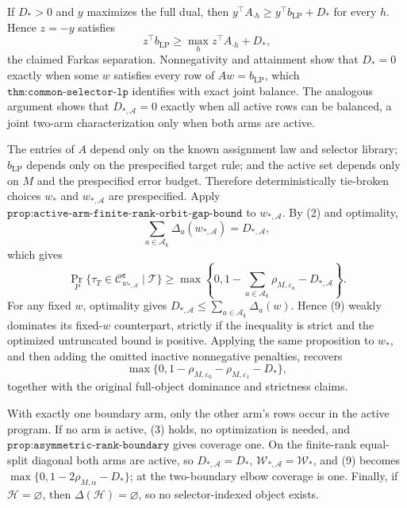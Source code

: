 If \(D_*>0\) and \(y\) maximizes the full dual, then \(y^\top A_{\cdot h}\ge y^\top b_{\mathrm{LP}}+D_*\) for every \(h\). Hence \(z=-y\) satisfies
\[
z^\top b_{\mathrm{LP}}\ge\max_h z^\top A_{\cdot h}+D_*,
\]
the claimed Farkas separation. Nonnegativity and attainment show that \(D_*=0\) exactly when some \(w\) satisfies every row of \(Aw=b_{\mathrm{LP}}\), which \(\texttt{thm:common-selector-lp}\) identifies with exact joint balance. The analogous argument shows that \(D_{*,\mathcal A}=0\) exactly when all active rows can be balanced, a joint two-arm characterization only when both arms are active.

The entries of \(A\) depend only on the known assignment law and selector library; \(b_{\mathrm{LP}}\) depends only on the prespecified target rule; and the active set depends only on \(M\) and the prespecified error budget. Therefore deterministically tie-broken choices \(w_*\) and \(w_{*,\mathcal A}\) are prespecified. Apply \(\texttt{prop:active-arm-finite-rank-orbit-gap-bound}\) to \(w_{*,\mathcal A}\). By (2) and optimality,
\[
\sum_{a\in\mathcal A_{\boldsymbol\varepsilon}}\Delta_a(w_{*,\mathcal A})=D_{*,\mathcal A},
\]
which gives
\[
\Pr_P\{\tau_T\in\mathcal C^{\boldsymbol\varepsilon}_{w_{*,\mathcal A}}\mid\mathcal T\}\ge\max\left\{0,1-\sum_{a\in\mathcal A_{\boldsymbol\varepsilon}}\rho_{M,\varepsilon_a}-D_{*,\mathcal A}\right\}.
\tag{9}
\]
For any fixed \(w\), optimality gives \(D_{*,\mathcal A}\le\sum_{a\in\mathcal A_{\boldsymbol\varepsilon}}\Delta_a(w)\). Hence (9) weakly dominates its fixed-\(w\) counterpart, strictly if the inequality is strict and the optimized untruncated bound is positive. Applying the same proposition to \(w_*\), and then adding the omitted inactive nonnegative penalties, recovers
\[
\max\{0,1-\rho_{M,\varepsilon_0}-\rho_{M,\varepsilon_1}-D_*\},
\]
together with the original full-object dominance and strictness claims.

With exactly one boundary arm, only the other arm's rows occur in the active program. If no arm is active, (3) holds, no optimization is needed, and \(\texttt{prop:asymmetric-rank-boundary}\) gives coverage one. On the finite-rank equal-split diagonal both arms are active, so \(D_{*,\mathcal A}=D_*\), \(\mathcal W_{*,\mathcal A}=\mathcal W_*\), and (9) becomes \(\max\{0,1-2\rho_{M,\alpha}-D_*\}\); at the two-boundary elbow coverage is one. Finally, if \(\mathcal H=\varnothing\), then \(\Delta(\mathcal H)=\varnothing\), so no selector-indexed object exists.